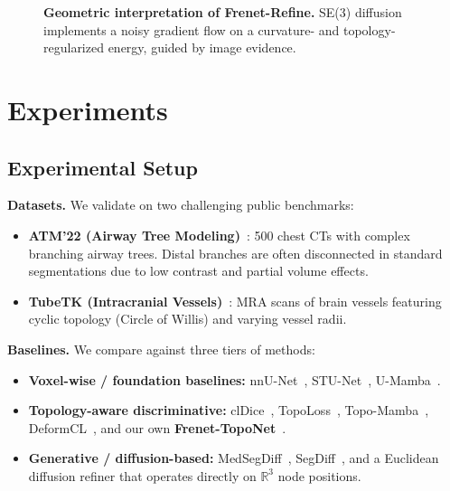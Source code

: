 \documentclass{article}
\newcommand{\modelname}{Frenet-Refine}
\newcommand{\stageone}{Frenet-TopoNet}
\begin{document}
\begin{figure}[t]
  \centering
  \caption{\textbf{Geometric interpretation of \modelname.} SE(3) diffusion implements a noisy gradient flow on a curvature- and topology-regularized energy, guided by image evidence.}
  \label{fig:curve_evolution}
\end{figure}

\section{Experiments}

\subsection{Experimental Setup}

\textbf{Datasets.}
We validate on two challenging public benchmarks:
\begin{itemize}[leftmargin=*]
    \item \textbf{ATM'22 (Airway Tree Modeling)}~\cite{qin2024atm}: 500 chest CTs with complex branching airway trees. Distal branches are often disconnected in standard segmentations due to low contrast and partial volume effects.
    \item \textbf{TubeTK (Intracranial Vessels)}~\cite{yang2021tubetk}: MRA scans of brain vessels featuring cyclic topology (Circle of Willis) and varying vessel radii.
\end{itemize}

\textbf{Baselines.}
We compare against three tiers of methods:
\begin{itemize}[leftmargin=*]
    \item \textbf{Voxel-wise / foundation baselines:} nnU-Net~\cite{isensee2021nnunet}, STU-Net~\cite{huang2024stu}, U-Mamba~\cite{ma2024umamba}.
    \item \textbf{Topology-aware discriminative:} clDice~\cite{shit2021cldice}, TopoLoss~\cite{hu2021topoloss,clough2020topological}, Topo-Mamba~\cite{gu2025topomamba}, DeformCL~\cite{zhao2025deformcl}, and our own \textbf{\stageone}~\cite{anonymous_ijcai}.
    \item \textbf{Generative / diffusion-based:} MedSegDiff~\cite{wu2023medsegdiff}, SegDiff~\cite{amit2024segdiff}, and a Euclidean diffusion refiner that operates directly on $\mathbb{R}^3$ node positions.
\end{itemize}
\end{document}
